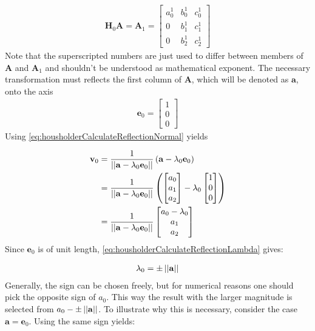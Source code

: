 \begin{align}
\mathbf{H}_0\mathbf{A} 
=
\mathbf{A}_1
=
\begin{bmatrix}
a_0^1&b_0^1&c_0^1\\
0    &b_1^1&c_1^1\\
0    &b_2^1&c_2^1
\end{bmatrix}					  
\end{align}
%
Note that the superscripted numbers are just used to differ between members of $\mathbf{A}$ and $\mathbf{A}_1$ and shouldn't be understood as mathematical exponent.
The necessary transformation must reflects the first column of $\mathbf{A}$, which will be denoted as $\mathbf{a}$, onto the axis
\begin{align}
\mathbf{e}_0  
=
\begin{bmatrix}
1\\
0\\
0
\end{bmatrix}
\end{align}
%
Using \cref{eq:housholderCalculateReflectionNormal} yields

\begin{align}
\mathbf{v}_0 
&= 
\frac{1}{\left\vert\left\vert\mathbf{a} - \lambda_0 \mathbf{e}_0\right\vert\right\vert}\left(\mathbf{a} - \lambda_0 \mathbf{e}_0\right)\\
&=
\frac{1}{\left\vert\left\vert\mathbf{a} - \lambda_0 \mathbf{e}_0\right\vert\right\vert}
\left(
\begin{bmatrix}
a_0\\
a_1\\
a_2
\end{bmatrix}
-	
\lambda_0	
\begin{bmatrix}
1\\
0\\
0
\end{bmatrix}
\right)\\
\label{eq:qrReflectionVector0StillContainingLambda}
&=
\frac{1}{\left\vert\left\vert\mathbf{a} - \lambda_0 \mathbf{e}_0\right\vert\right\vert}
\begin{bmatrix}
a_0 - \lambda_0\\
a_1\\
a_2
\end{bmatrix}
\end{align}
%
Since $\mathbf{e}_0$ is of unit length, \cref{eq:housholderCalculateReflectionLambda} gives:

\begin{align}
\lambda_0 = \pm \left\vert\left\vert\mathbf{a}\right\vert\right\vert
\end{align}
%
Generally, the sign can be chosen freely, but for numerical reasons one should pick the opposite sign of $a_0$. 
This way the result with the larger magnitude is selected from $a_0 -  \pm \left\vert\left\vert\mathbf{a}\right\vert\right\vert$.
To illustrate why this is necessary, consider the case $\mathbf{a} = \mathbf{e}_0$.
Using the same sign yields:

